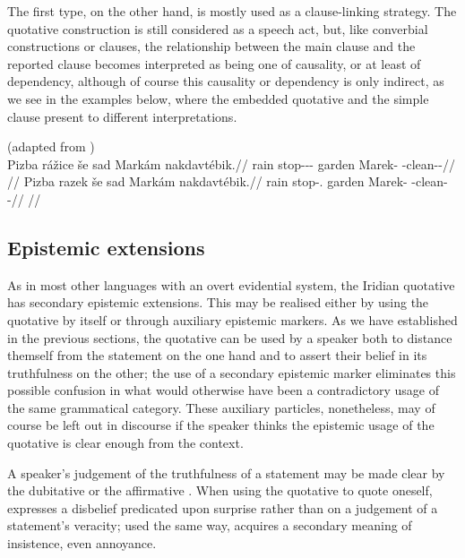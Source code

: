 The first type, on the other hand, is mostly used as a clause-linking strategy. The quotative construction is still considered as a speech act, but, like converbial constructions or  clauses, the relationship between the main clause and the reported clause becomes interpreted as being one of causality, or at least of dependency, although of course this causality or dependency is only indirect, as we see in the examples below, where the embedded quotative and the simple  clause present to different interpretations.

\pex
  \a(adapted from \cite[3]{tomioka2019})\\
  \begingl
    \gla Pizba r\'ažice še sad Mark\'am nakdavt\'ebik.//
    \glb rain stop-\Av{}-\Pf{}-\Quot{} \Com{} garden Marek-\Agt{} \Incp{}-clean-\Ben{}-\Pf{}//
    \glft {}//
  \endgl
  \a\begingl
    \gla Pizba razek še sad Mark\'am nakdavt\'ebik.//
    \glb rain stop-\Av{}.\Pf{} \Com{} garden Marek-\Agt{} \Incp{}-clean-\Ben{}-\Pf{}//
    \glft {}//
  \endgl
\xe


\subsection{Epistemic extensions}

As in most other languages with an overt evidential system, the Iridian quotative has secondary epistemic extensions. This may be realised either by using the quotative by itself or through auxiliary epistemic markers. As we have established in the previous sections, the quotative can be used by a speaker both to distance themself from the statement on the one hand and to assert their belief in its truthfulness on the other; the use of a secondary epistemic marker eliminates this possible confusion in what would otherwise have been a contradictory usage of the same grammatical category. These auxiliary particles, nonetheless, may of course be left out in discourse if the speaker thinks the epistemic usage of the quotative is clear enough from the context.

A speaker’s judgement of the truthfulness of a statement may be made clear by the dubitative  or the affirmative . When using the quotative to quote oneself,  expresses a disbelief predicated upon surprise rather than on a judgement of a statement’s veracity; used the same way,  acquires a secondary meaning of insistence, even annoyance.

